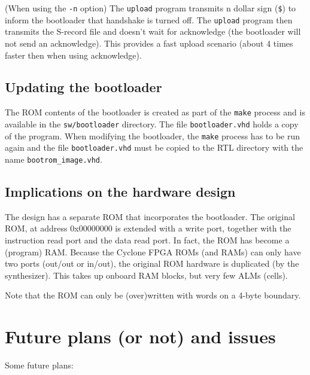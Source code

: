 \documentclass[12pt]{article}
\begin{document}
(When using the \lstinline|-n| option) The \lstinline|upload| program transmits n dollar sign (\lstinline|$|) to inform the bootloader that handshake is turned off. The \lstinline|upload| program then transmits the S-record file and doesn't wait for acknowledge (the bootloader will not send an acknowledge). This provides a fast upload scenario (about 4 times faster then when using acknowledge).

\subsection{Updating the bootloader}
The ROM contents of the bootloader is created as part of the \lstinline|make| process and is available in the \lstinline|sw/bootloader| directory. The file \lstinline|bootloader.vhd| holds a copy of the program. When modifying the bootloader, the \lstinline|make| process has to be run again and the file \lstinline|bootloader.vhd| must be copied to the RTL directory with the name \lstinline|bootrom_image.vhd|.

\subsection{Implications on the hardware design}
The design has a separate ROM that incorporates the bootloader. The original ROM, at address 0x00000000 is extended with a write port, together with the instruction read port and the data read port. In fact, the ROM has become a (program) RAM. Because the Cyclone FPGA ROMs (and RAMs) can only have two ports (out/out or in/out), the original ROM hardware is duplicated (by the synthesizer). This takes up onboard RAM blocks, but very few ALMs (cells). %

Note that the ROM can only be (over)written with words on a 4-byte boundary.

\section{Future plans (or not) and issues}
Some future plans:
\end{document}
